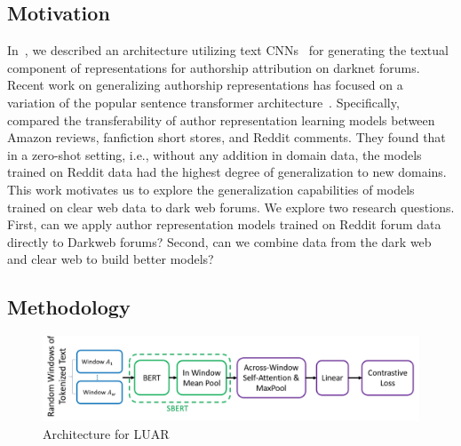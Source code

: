 \subsection{Motivation}
\label{chp:stylometry_extensions:followingTrail:motivation}
In~, we described an architecture utilizing text CNNs~\citep{kim2014convolutional} for generating the textual component of representations for authorship attribution on darknet forums.
Recent work on generalizing authorship representations has focused on a variation of the popular sentence transformer architecture~\citep{reimers2019sentencebert}.
Specifically, \citet{riverastao2021learning} compared the transferability of author representation learning models between Amazon reviews, fanfiction short stores, and Reddit comments.
They found that in a zero-shot setting, i.e., without any addition in domain data, the models trained on Reddit data had the highest degree of generalization to new domains.
This work motivates us to explore the generalization capabilities of models trained on clear web data to dark web forums.
We explore two research questions.
First, can we apply author representation models trained on Reddit forum data directly to Darkweb forums?
Second, can we combine data from the dark web and clear web to build better models?

\subsection{Methodology}
\label{chp:stylometry_extensions:followingTrail:methodology}

\begin{figure}
    \centering
    \includegraphics[width=\linewidth]{stylometryExtensions/figures/LUAR.pdf}
    \caption{Architecture for LUAR~\citep{riverastao2021learning}}
    \label{fig:stylometry_extensions:followingTrail:LUAR}
\end{figure}